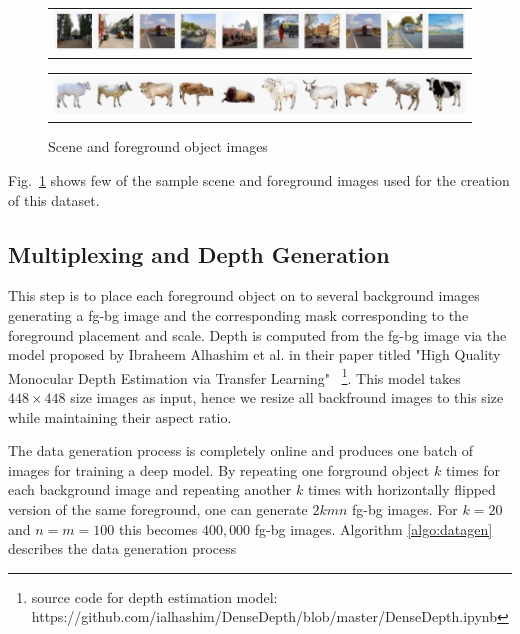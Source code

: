 \documentclass[review]{cvpr}
\begin{document}
\begin{figure}
  \begin{center}
  \begin{tabular}{@{}c@{}}
    \includegraphics[width=1.0\linewidth]{bgimages.jpg}
  \end{tabular}
  \begin{tabular}{@{}c@{}}
      \includegraphics[width=1.0\linewidth]{fgimages.jpg}
  \end{tabular}
  \end{center}
  \caption{Scene and foreground object images}
  \label{fig:sceneandfg}
\end{figure}

Fig.~\ref{fig:sceneandfg} shows few of the sample scene and foreground images used for the creation of this dataset. 

\subsection{Multiplexing and Depth Generation}

This step is to place each foreground object on to several background images generating a fg-bg image and the corresponding mask corresponding to the foreground placement and scale. Depth is computed from the fg-bg image via the model proposed by Ibraheem Alhashim et al. in their paper titled "High Quality Monocular Depth Estimation via Transfer Learning" ~\cite{alhashim2018high}\footnote{source code for depth estimation model: https://github.com/ialhashim/DenseDepth/blob/master/DenseDepth.ipynb}. This model takes $448\times448$ size images as input, hence we resize all backfround images to this size while maintaining their aspect ratio.

The data generation process is completely online and produces one batch of images for training a deep model. By repeating one forground object $k$ times for each background image and repeating another $k$ times with horizontally flipped version of the same foreground, one can generate $2kmn$ fg-bg images. For $k=20$ and $n=m=100$ this becomes $400,000$ fg-bg images. Algorithm \ref{algo:datagen} describes the data generation process
\end{document}
